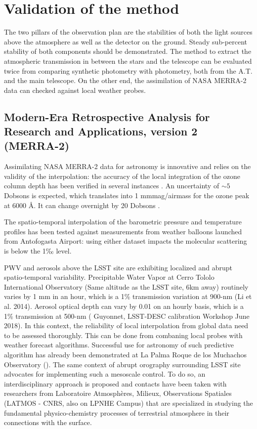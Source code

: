 \documentclass[DM,authoryear,toc,lsstdraft]{lsstdoc}
\begin{document}
\section{Validation of the method}


The two pillars of the observation plan are the stabilities of both the light sources above the atmosphere as well as the detector on the ground. Steady sub-percent stability of both components should be demonstrated. The method to extract the atmospheric transmission in between the stars and the telescope can be evaluated twice from comparing synthetic photometry with photometry, both from the A.T. and the main telescope. On the other end, the assimilation of NASA MERRA-2 data can checked against local weather probes.

\subsection{Modern-Era Retrospective Analysis for Research and Applications, version 2 (MERRA-2)}

Assimilating NASA MERRA-2 data for astronomy is innovative and relies on the validity of the interpolation: the accuracy of the local integration of the ozone column depth has been verified in several instances \citep{doi:10.1175/JCLI-D-16-0609.1}. An uncertainty of $\sim 5$ Dobsons is expected, which translates into 1 mmmag/airmass for the ozone peak at 6000 Å. It can change overnight by 20 Dobsons \citep{2013A&A...549A...8B}.

The spatio-temporal interpolation of the barometric pressure and temperature profiles has been tested against measurements from weather balloons launched from Antofogasta Airport: using either dataset impacts the molecular scattering is below the 1‰ level. 

PWV and aerosols above the LSST site are exhibiting localized and abrupt spatio-temporal variability. Precipitable Water Vapor at Cerro Tololo International Observatory (Same altitude as the LSST site, 6km away) routinely varies by 1 mm in an hour,  which is a 1\% transmission variation at 900-nm (Li et al. 2014). Aerosol optical depth can vary by 0.01 on an hourly basis, which is a 1\% transmission at 500-nm ( Guyonnet, LSST-DESC calibration Workshop June 2018). In this context, the reliability of local interpolation from global data need to be assessed thoroughly. This can be done from combaning local probes with weather forecast algorithms. Successful use for astronomy of such predictive algorithm has already been demonstrated at La Palma Roque de los Muchachos Observatory (\citealt{2018MNRAS.477.5477P}). The same context of abrupt orography surrounding LSST site advocates for implementing such a mesoscale control. To do so, an interdisciplinary approach is proposed and contacts have been taken with researchers from Laboratoire Atmosphères, Milieux, Observations Spatiales (LATMOS - CNRS, also on LPNHE Campus) that are specialized in studying the fundamental physico-chemistry processes of terrestrial atmosphere in their connections with the surface.
\end{document}
